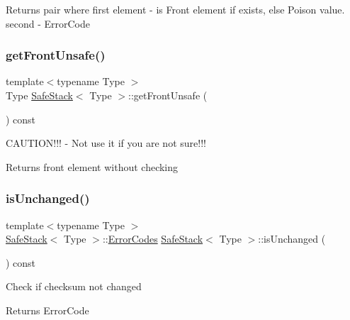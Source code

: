 \begin{DoxyReturn}{Returns}
pair where first element -\/ is Front element if exists, else Poison value. second -\/ Error\+Code 
\end{DoxyReturn}
\mbox{\label{classSafeStack_ae6e2abc9e3718a8f426ad55fff7720c2}} 
\subsubsection{\texorpdfstring{get\+Front\+Unsafe()}{getFrontUnsafe()}}
{\footnotesize\ttfamily template$<$typename Type $>$ \\
Type \hyperlink{classSafeStack}{Safe\+Stack}$<$ Type $>$\+::get\+Front\+Unsafe (\begin{DoxyParamCaption}{ }\end{DoxyParamCaption}) const}

C\+A\+U\+T\+I\+O\+N!!! -\/ Not use it if you are not sure!!! \begin{DoxyReturn}{Returns}
front element without checking 
\end{DoxyReturn}
\mbox{\label{classSafeStack_a6ba7568bccbbd336aa7f6ee6102cd411}} 
\subsubsection{\texorpdfstring{is\+Unchanged()}{isUnchanged()}}
{\footnotesize\ttfamily template$<$typename Type $>$ \\
\hyperlink{classSafeStack}{Safe\+Stack}$<$ Type $>$\+::\hyperlink{classSafeStack_a3a6ee072918bd0a2c09fa0ea12c1ab64}{Error\+Codes} \hyperlink{classSafeStack}{Safe\+Stack}$<$ Type $>$\+::is\+Unchanged (\begin{DoxyParamCaption}{ }\end{DoxyParamCaption}) const}

Check if checksum not changed \begin{DoxyReturn}{Returns}
Error\+Code 
\end{DoxyReturn}
\mbox{\label{classSafeStack_a7add18e30f467b9b08233feeed6544df}} 
